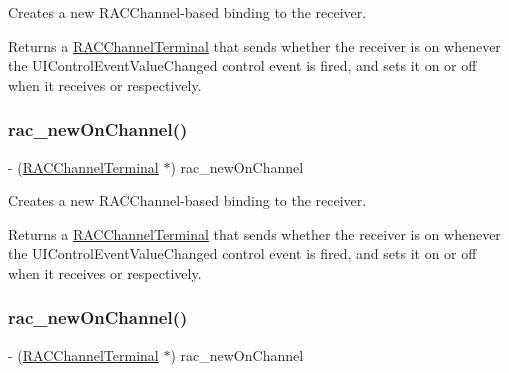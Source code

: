 Creates a new R\+A\+C\+Channel-\/based binding to the receiver.

Returns a \mbox{\hyperlink{interface_r_a_c_channel_terminal}{R\+A\+C\+Channel\+Terminal}} that sends whether the receiver is on whenever the U\+I\+Control\+Event\+Value\+Changed control event is fired, and sets it on or off when it receives  or  respectively. \mbox{\label{category_u_i_switch_07_r_a_c_signal_support_08_aa4988be5efa10bfa187d4be7815941f3}} 
\subsubsection{\texorpdfstring{rac\+\_\+new\+On\+Channel()}{rac\_newOnChannel()}\hspace{0.1cm}{\footnotesize\ttfamily [2/3]}}
{\footnotesize\ttfamily -\/ (\mbox{\hyperlink{interface_r_a_c_channel_terminal}{R\+A\+C\+Channel\+Terminal}} $\ast$) rac\+\_\+new\+On\+Channel \begin{DoxyParamCaption}{ }\end{DoxyParamCaption}}

Creates a new R\+A\+C\+Channel-\/based binding to the receiver.

Returns a \mbox{\hyperlink{interface_r_a_c_channel_terminal}{R\+A\+C\+Channel\+Terminal}} that sends whether the receiver is on whenever the U\+I\+Control\+Event\+Value\+Changed control event is fired, and sets it on or off when it receives  or  respectively. \mbox{\label{category_u_i_switch_07_r_a_c_signal_support_08_aa4988be5efa10bfa187d4be7815941f3}} 
\subsubsection{\texorpdfstring{rac\+\_\+new\+On\+Channel()}{rac\_newOnChannel()}\hspace{0.1cm}{\footnotesize\ttfamily [3/3]}}
{\footnotesize\ttfamily -\/ (\mbox{\hyperlink{interface_r_a_c_channel_terminal}{R\+A\+C\+Channel\+Terminal}} $\ast$) rac\+\_\+new\+On\+Channel \begin{DoxyParamCaption}{ }\end{DoxyParamCaption}}

